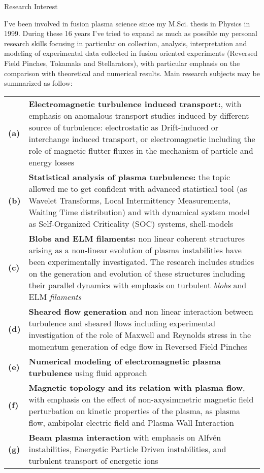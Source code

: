{\begin{cvblock}{Research Interest}
  \end{cvblock}
I've been involved in fusion plasma science since my M.Sci. thesis in
Physics in 1999. During these 16 years I've tried to expand as much as
possible my personal research skills focusing in particular on collection, analysis, interpretation and modeling of experimental data
collected in fusion oriented experiments (Reversed Field Pinches,
Tokamaks and Stellarators), with particular emphasis on the comparison
with theoretical and numerical results. Main research subjects may be summarized as follow: 
\setlength\LTleft{0.75in}
\setlength\LTright{1in}
\begin{longtable}{@{}>{\bfseries} p{} p{}@{}}
(a) & \textbf{Electromagnetic turbulence induced transport:}, with
emphasis on anomalous transport studies induced by different source of
turbulence: electrostatic as Drift-induced or interchange induced
transport, or electromagnetic including the role of magnetic flutter fluxes
in the mechanism of particle and energy losses\\
(b) & \textbf{Statistical analysis of plasma turbulence:} the topic
allowed me to get confident with advanced statistical tool (as Wavelet Transforms, Local Intermittency
  Measurements, Waiting Time distribution) and with dynamical system
  model as Self-Organized Criticality (SOC) systems, shell-models  \\
(c) & \textbf{Blobs and ELM filaments:} non linear coherent structures
arising as a non-linear evolution of plasma
instabilities have been experimentally investigated. The research
includes studies on the generation and evolution of these
structures including
their parallel dynamics with emphasis on turbulent \emph{blobs} and
ELM \emph{filaments}  \\
(d) & \textbf{Sheared flow generation} and non linear interaction
between turbulence and sheared flows including experimental
investigation of the role of Maxwell and Reynolds stress in the
momentum generation of edge flow in Reversed Field Pinches  \\
(e) & \textbf{Numerical modeling of electromagnetic plasma turbulence}
  using fluid approach \\
(f) & \textbf{Magnetic topology and its relation with plasma flow}, with
emphasis on the effect of non-axysimmetric magnetic field perturbation on kinetic
properties of the plasma, as plasma flow, ambipolar electric field and
Plasma Wall Interaction\\
(g) & \textbf{Beam plasma interaction} with emphasis on Alfv\'en instabilities,
Energetic Particle Driven instabilities, and turbulent transport of
energetic ions
\end{longtable}

}
